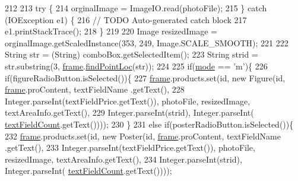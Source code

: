 \begin{DoxyCode}
212                     
213                     \textcolor{keywordflow}{try} \{
214                         orginalImage = ImageIO.read(photoFile);
215                     \} \textcolor{keywordflow}{catch} (IOException e1) \{
216                         \textcolor{comment}{// TODO Auto-generated catch block}
217                         e1.printStackTrace();
218                     \}
219                     
220                     Image resizedImage = orginalImage.getScaledInstance(353, 249, Image.SCALE\_SMOOTH);
221                     
222                     String str = (String) comboBox.getSelectedItem();
223                     String strid = str.substring(3, \hyperlink{classpkg_1_1_product_u_i_a49f9ae805cdac34c866e6c1593b6e625}{frame}.\hyperlink{classpkg_1_1_management_u_i_a23fb9a0d7bae4106d1f604b6035de259}{findPointLoc}(str));
224                     
225                     \textcolor{keywordflow}{if}(\hyperlink{classpkg_1_1_product_u_i_a345f05a195b28c741bb8227ded5873fa}{mode} == \textcolor{charliteral}{'m'})\{
226                         \textcolor{keywordflow}{if}(figureRadioButton.isSelected())\{
227                             \hyperlink{classpkg_1_1_product_u_i_a49f9ae805cdac34c866e6c1593b6e625}{frame}.products.set(\textcolor{keywordtype}{id}, \textcolor{keyword}{new} Figure(\textcolor{keywordtype}{id}, \hyperlink{classpkg_1_1_product_u_i_a49f9ae805cdac34c866e6c1593b6e625}{frame}.proContent, textFieldName
      .getText(),
228                                     Integer.parseInt(textFieldPrice.getText()), photoFile, resizedImage, 
      textAreaInfo.getText(),
229                                     Integer.parseInt(strid), Integer.parseInt(
      \hyperlink{classpkg_1_1_product_u_i_ac35d0e67c152e5bcc6cdf3b9cc79f90b}{textFieldCount}.getText())));
230                         \}
231                         \textcolor{keywordflow}{else} \textcolor{keywordflow}{if}(posterRadioButton.isSelected())\{
232                             \hyperlink{classpkg_1_1_product_u_i_a49f9ae805cdac34c866e6c1593b6e625}{frame}.products.set(\textcolor{keywordtype}{id}, \textcolor{keyword}{new} Poster(\textcolor{keywordtype}{id}, \hyperlink{classpkg_1_1_product_u_i_a49f9ae805cdac34c866e6c1593b6e625}{frame}.proContent, textFieldName
      .getText(),
233                                     Integer.parseInt(textFieldPrice.getText()), photoFile, resizedImage, 
      textAreaInfo.getText(),
234                                     Integer.parseInt(strid), Integer.parseInt(
      \hyperlink{classpkg_1_1_product_u_i_ac35d0e67c152e5bcc6cdf3b9cc79f90b}{textFieldCount}.getText())));

\end{DoxyCode}
